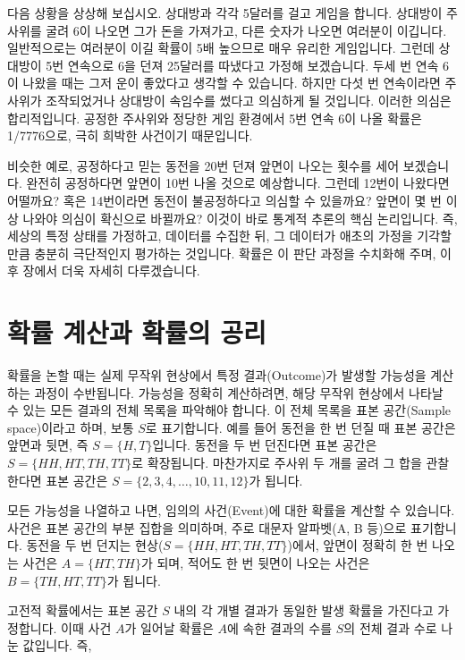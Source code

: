 \documentclass[
]{scrbook}
\begin{document}
다음 상황을 상상해 보십시오. 상대방과 각각 5달러를 걸고 게임을 합니다.
상대방이 주사위를 굴려 6이 나오면 그가 돈을 가져가고, 다른 숫자가 나오면
여러분이 이깁니다. 일반적으로는 여러분이 이길 확률이 5배 높으므로 매우
유리한 게임입니다. 그런데 상대방이 5번 연속으로 6을 던져 25달러를
따냈다고 가정해 보겠습니다. 두세 번 연속 6이 나왔을 때는 그저 운이
좋았다고 생각할 수 있습니다. 하지만 다섯 번 연속이라면 주사위가
조작되었거나 상대방이 속임수를 썼다고 의심하게 될 것입니다. 이러한
의심은 합리적입니다. 공정한 주사위와 정당한 게임 환경에서 5번 연속 6이
나올 확률은 1/7776으로, 극히 희박한 사건이기 때문입니다.

비슷한 예로, 공정하다고 믿는 동전을 20번 던져 앞면이 나오는 횟수를 세어
보겠습니다. 완전히 공정하다면 앞면이 10번 나올 것으로 예상합니다. 그런데
12번이 나왔다면 어떨까요? 혹은 14번이라면 동전이 불공정하다고 의심할 수
있을까요? 앞면이 몇 번 이상 나와야 의심이 확신으로 바뀔까요? 이것이 바로
통계적 추론의 핵심 논리입니다. 즉, 세상의 특정 상태를 가정하고, 데이터를
수집한 뒤, 그 데이터가 애초의 가정을 기각할 만큼 충분히 극단적인지
평가하는 것입니다. 확률은 이 판단 과정을 수치화해 주며, 이후 장에서 더욱
자세히 다루겠습니다.

\section{확률 계산과 확률의
공리}\label{uxd655uxb960-uxacc4uxc0b0uxacfc-uxd655uxb960uxc758-uxacf5uxb9ac}

확률을 논할 때는 실제 무작위 현상에서 특정 결과(Outcome)가 발생할
가능성을 계산하는 과정이 수반됩니다. 가능성을 정확히 계산하려면, 해당
무작위 현상에서 나타날 수 있는 모든 결과의 전체 목록을 파악해야 합니다.
이 전체 목록을 표본 공간(Sample space)이라고 하며, 보통 \(S\)로
표기합니다. 예를 들어 동전을 한 번 던질 때 표본 공간은 앞면과 뒷면, 즉
\(S=\{H, T\}\)입니다. 동전을 두 번 던진다면 표본 공간은
\(S=\{HH, HT, TH, TT\}\)로 확장됩니다. 마찬가지로 주사위 두 개를 굴려 그
합을 관찰한다면 표본 공간은 \(S=\{2, 3, 4, \dots, 10, 11, 12\}\)가
됩니다.

모든 가능성을 나열하고 나면, 임의의 사건(Event)에 대한 확률을 계산할 수
있습니다. 사건은 표본 공간의 부분 집합을 의미하며, 주로 대문자 알파벳(A,
B 등)으로 표기합니다. 동전을 두 번 던지는
현상(\(S=\{HH, HT, TH, TT\}\))에서, 앞면이 정확히 한 번 나오는 사건은
\(A=\{HT, TH\}\)가 되며, 적어도 한 번 뒷면이 나오는 사건은
\(B=\{TH, HT, TT\}\)가 됩니다.

고전적 확률에서는 표본 공간 \(S\) 내의 각 개별 결과가 동일한 발생 확률을
가진다고 가정합니다. 이때 사건 \(A\)가 일어날 확률은 \(A\)에 속한 결과의
수를 \(S\)의 전체 결과 수로 나눈 값입니다. 즉,
\end{document}
